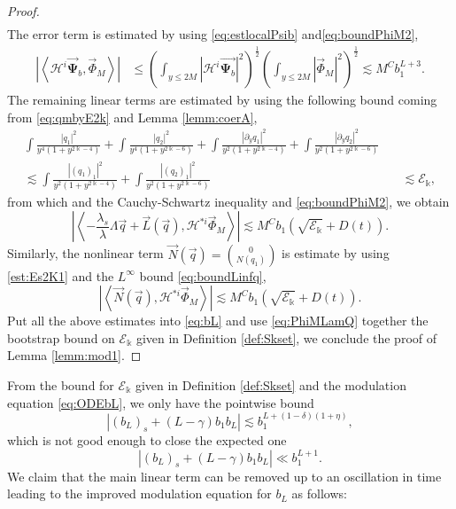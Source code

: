 \documentclass[11pt]{aims}
\theoremstyle{definition}
\numberwithin{equation}{section}
\begin{document}
\begin{proof}
\begin{align*}
\end{align*} 
The error term is estimated by using \eqref{eq:estlocalPsib} and\eqref{eq:boundPhiM2}, 
\begin{align*}
\left|\left<{\mathscr{H}}^i\vec{\mathbf{\Psi}}_b, \vec \Phi_M \right>\right| &\leq \left(\int_{y \leq 2M}|{\mathscr{H}}^i \vec{\mathbf{\Psi}_b}|^2 \right)^\frac 12 \left(\int_{y \leq 2M} |\vec \Phi_M|^2 \right)^\frac 12 \lesssim M^Cb_1^{L+3}.
\end{align*}
The remaining linear terms are estimated by using the following bound coming from \eqref{eq:qmbyE2k} and Lemma \ref{lemm:coerA},
\begin{align}
\int \frac{|q_1|^2}{y^4(1 + y^{2\Bbbk - 4})} + \int \frac{|q_2|^2}{y^4(1 + y^{2\Bbbk - 6})} +
\int \frac{|{\partial_y} q_1|^2}{y^2(1 + y^{2\Bbbk - 4})} + \int \frac{|{\partial_y} q_2|^2}{y^2(1 + y^{2\Bbbk - 6})}& \nonumber\\
\lesssim \int \frac{|(q_1)_1|^2}{y^2(1 + y^{2\Bbbk - 4})} + \int \frac{|(q_2)_1|^2}{y^2(1 + y^{2\Bbbk - 6})} &\quad \lesssim {\mathscr{E}}_\Bbbk,\label{est:Es2K1}
\end{align}
from which and the Cauchy-Schwartz inequality and \eqref{eq:boundPhiM2}, we obtain
$$\left|\left<-\frac{\lambda_s}{\lambda} \Lambda \vec q + \vec L(\vec q), {\mathscr{H}}^{*i}\vec \Phi_M\right>\right| \lesssim M^Cb_1\left(\sqrt{{\mathscr{E}}_{\Bbbk}} + D(t)\right). $$
Similarly, the nonlinear term $\vec N(\vec q) = \binom{0}{N(q_1)}$ is estimate by using \eqref{est:Es2K1} and the $L^\infty$ bound \eqref{eq:boundLinfq}, 
$$\left|\left<\vec N(\vec q), {\mathscr{H}}^{*i}\vec \Phi_M\right>\right| \lesssim M^Cb_1\left(\sqrt{{\mathscr{E}}_{\Bbbk}} + D(t)\right).$$
Put all the above estimates into \eqref{eq:bL} and use \eqref{eq:PhiMLamQ} together the bootstrap bound on ${\mathscr{E}}_\Bbbk$ given in Definition \ref{def:Skset}, we conclude the proof of Lemma \ref{lemm:mod1}.
\end{proof}

\medskip

From the bound for ${\mathscr{E}}_{\Bbbk}$ given in Definition \ref{def:Skset} and the modulation equation \eqref{eq:ODEbL}, we only have the pointwise bound
$$|(b_L)_s + (L - \gamma)b_1b_L| \lesssim b_1^{L + (1 - \delta)(1 + \eta)},$$
which is not good enough to close the expected one
$$|(b_L)_s + (L - \gamma)b_1b_L| \ll b_1^{L + 1}.$$
We claim that the main linear term can be removed up to an oscillation in time leading to the improved modulation equation for $b_L$ as follows:
\end{document}
